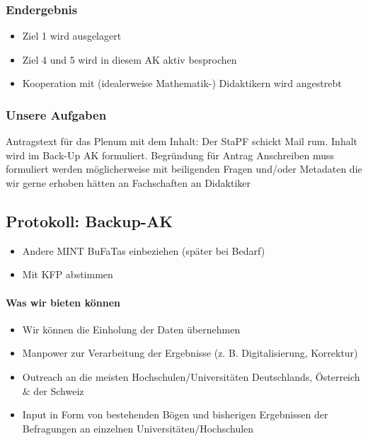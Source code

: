 		\subsubsection*{Endergebnis}
			\begin{itemize}
				\item Ziel 1 wird ausgelagert
				\item Ziel 4 und 5 wird in diesem AK aktiv besprochen
				\item Kooperation mit (idealerweise Mathematik-) Didaktikern wird angestrebt
			\end{itemize}

		\subsubsection*{Unsere Aufgaben}
			\begin{outline}
				\1 Antragstext für das Plenum mit dem Inhalt: Der StaPF schickt Mail rum. Inhalt wird im Back-Up AK formuliert.
					\2 Begründung für Antrag
				\1 Anschreiben muss formuliert werden
					\2 möglicherweise mit beiligenden Fragen und/oder Metadaten die wir gerne erhoben hätten
						\3 an Fachschaften
						\3 an Didaktiker
			\end{outline}


	\subsection*{Protokoll: Backup-AK}
		\begin{itemize}
			\item Andere MINT BuFaTas einbeziehen (später bei Bedarf)
			\item Mit KFP abstimmen
		\end{itemize}

		\paragraph{Was wir bieten können}
			\begin{itemize}
				\item Wir können die Einholung der Daten übernehmen
				\item Manpower zur Verarbeitung der Ergebnisse (z. B. Digitalisierung, Korrektur)
				\item Outreach an die meisten Hochschulen/Universitäten Deutschlands, Österreich \& der Schweiz
				\item Input in Form von bestehenden Bögen und bisherigen Ergebnissen der Befragungen an einzelnen Universitäten/Hochschulen
			\end{itemize}

